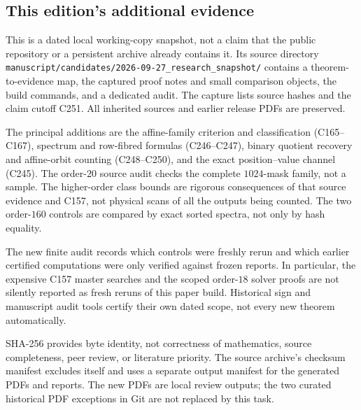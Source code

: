 \subsection*{This edition's additional evidence}

This is a dated local working-copy snapshot, not a claim that the
public repository or a persistent archive already contains it.
Its source directory
\nolinkurl{manuscript/candidates/2026-09-27_research_snapshot/}
contains a theorem-to-evidence map, the captured proof notes and
small comparison objects, the build commands, and a dedicated audit.
The capture lists source hashes and the claim cutoff C251.
All inherited sources and earlier release PDFs are preserved.

The principal additions are the affine-family criterion and
classification (C165--C167), spectrum and row-fibred formulas
(C246--C247), binary quotient recovery and affine-orbit counting
(C248--C250), and the exact position--value channel (C245).
The order-$20$ source audit checks the complete $1024$-mask family,
not a sample. The higher-order class bounds are rigorous
consequences of that source evidence and C157, not physical scans
of all the outputs being counted. The two order-$160$ controls
are compared by exact sorted spectra, not only by hash equality.

The new finite audit records which controls were freshly rerun
and which earlier certified computations were only verified
against frozen reports. In particular, the expensive C157 master
searches and the scoped order-$18$ solver proofs are not silently
reported as fresh reruns of this paper build. Historical sign and
manuscript audit tools certify their own dated scope, not every
new theorem automatically.

SHA-256 provides byte identity, not correctness of mathematics,
source completeness, peer review, or literature priority.
The source archive's checksum manifest excludes itself and uses
a separate output manifest for the generated PDFs and reports.
The new PDFs are local review outputs; the two curated historical
PDF exceptions in Git are not replaced by this task.

